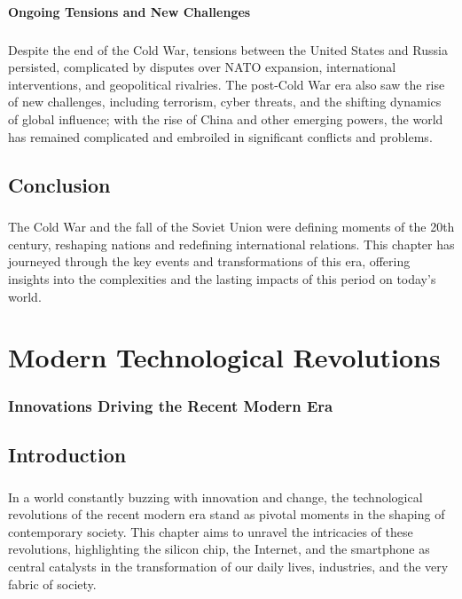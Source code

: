 \documentclass{book}
\begin{document}
\subsubsection*{Ongoing Tensions and New Challenges}
\paragraph{}
Despite the end of the Cold War, tensions between the United States and Russia persisted, complicated by disputes over NATO expansion, international interventions, and geopolitical rivalries. The post-Cold War era also saw the rise of new challenges, including terrorism, cyber threats, and the shifting dynamics of global influence; with the rise of China and other emerging powers, the world has remained complicated and embroiled in significant conflicts and problems.

\section*{Conclusion}
\paragraph{}
The Cold War and the fall of the Soviet Union were defining moments of the 20th century, reshaping nations and redefining international relations. This chapter has journeyed through the key events and transformations of this era, offering insights into the complexities and the lasting impacts of this period on today’s world.

\chapter{Modern Technological Revolutions}
\subsection*{Innovations Driving the Recent Modern Era}

\section*{Introduction}
\paragraph{}
In a world constantly buzzing with innovation and change, the technological revolutions of the recent modern era stand as pivotal moments in the shaping of contemporary society. This chapter aims to unravel the intricacies of these revolutions, highlighting the silicon chip, the Internet, and the smartphone as central catalysts in the transformation of our daily lives, industries, and the very fabric of society.
\end{document}
